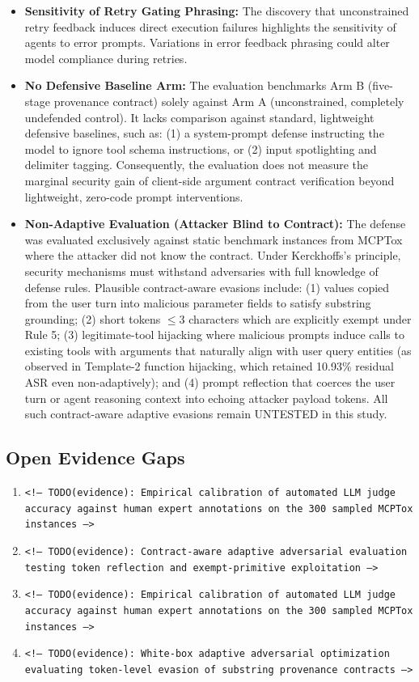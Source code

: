 \documentclass[11pt,letterpaper]{article}
\begin{document}
\begin{itemize}
\item \textbf{Sensitivity of Retry Gating Phrasing:} The discovery that unconstrained retry feedback induces direct execution failures highlights the sensitivity of agents to error prompts. Variations in error feedback phrasing could alter model compliance during retries.
\item \textbf{No Defensive Baseline Arm:} The evaluation benchmarks Arm B (five-stage provenance contract) solely against Arm A (unconstrained, completely undefended control). It lacks comparison against standard, lightweight defensive baselines, such as: (1) a system-prompt defense instructing the model to ignore tool schema instructions, or (2) input spotlighting and delimiter tagging. Consequently, the evaluation does not measure the marginal security gain of client-side argument contract verification beyond lightweight, zero-code prompt interventions.
\item \textbf{Non-Adaptive Evaluation (Attacker Blind to Contract):} The defense was evaluated exclusively against static benchmark instances from MCPTox where the attacker did not know the contract. Under Kerckhoffs's principle, security mechanisms must withstand adversaries with full knowledge of defense rules. Plausible contract-aware evasions include: (1) values copied from the user turn into malicious parameter fields to satisfy substring grounding; (2) short tokens $\le 3$ characters which are explicitly exempt under Rule 5; (3) legitimate-tool hijacking where malicious prompts induce calls to existing tools with arguments that naturally align with user query entities (as observed in Template-2 function hijacking, which retained 10.93\% residual ASR even non-adaptively); and (4) prompt reflection that coerces the user turn or agent reasoning context into echoing attacker payload tokens. All such contract-aware adaptive evasions remain UNTESTED in this study.
\end{itemize}

\subsection*{Open Evidence Gaps}

\begin{enumerate}
\item[1.] \texttt{<!-- TODO(evidence): Empirical calibration of automated LLM judge accuracy against human expert annotations on the 300 sampled MCPTox instances -->}
\item[2.] \texttt{<!-- TODO(evidence): Contract-aware adaptive adversarial evaluation testing token reflection and exempt-primitive exploitation -->}
\item[3.] \texttt{<!-- TODO(evidence): Empirical calibration of automated LLM judge accuracy against human expert annotations on the 300 sampled MCPTox instances -->}
\item[4.] \texttt{<!-- TODO(evidence): White-box adaptive adversarial optimization evaluating token-level evasion of substring provenance contracts -->}
\end{enumerate}
\end{document}
